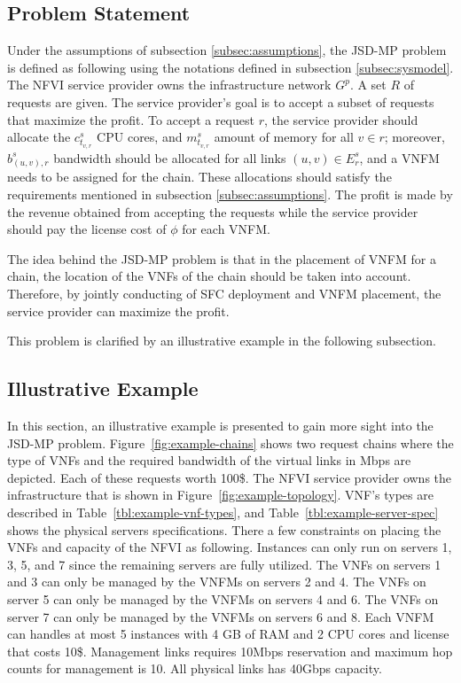 \subsection{Problem Statement}
Under the assumptions of subsection \ref{subsec:assumptions}, the JSD-MP problem is defined as following using the notations defined in subsection \ref{subsec:sysmodel}.
The NFVI service provider owns the infrastructure network \(G^p\). A set \(R\) of requests are given. The service provider's goal is to accept a subset of requests that maximize the profit.
To accept a request \(r\), the service provider should allocate the \(c^s_{t_{v,r}}\) CPU cores, and \(m^s_{t_{v,r}}\) amount of memory for all \(v \in r\);
moreover, \(b^s_{(u,v),r}\) bandwidth should be allocated for all links \((u,v) \in E^s_r\), and a VNFM needs to be assigned for the chain.
These allocations should satisfy the requirements mentioned in subsection \ref{subsec:assumptions}.
The profit is made by the revenue obtained from accepting the requests while the service provider should pay the license cost of \(\phi\) for each VNFM.

The idea behind the JSD-MP problem is that in the placement of VNFM for a chain, the location of the VNFs of the chain should be taken into account. Therefore, by jointly conducting of SFC deployment and VNFM placement, the service provider can maximize the profit.

This problem is clarified by an illustrative example in the following subsection.

\subsection{Illustrative Example}
In this section, an illustrative example is presented to gain more sight into the JSD-MP problem.
Figure~\ref{fig:example-chains} shows two request chains where the type of VNFs and the required bandwidth of the virtual links in Mbps are depicted. Each of these requests worth 100\$.
The NFVI service provider owns the infrastructure that is shown in Figure~\ref{fig:example-topology}.
VNF's types are described in Table~\ref{tbl:example-vnf-types}, and 
Table~\ref{tbl:example-server-spec} shows the physical servers specifications.
There a few constraints on placing the VNFs and capacity of the NFVI as following.
Instances can only run on servers 1, 3, 5, and 7 since the remaining servers are fully utilized.
The VNFs on servers 1 and 3 can only be managed by the VNFMs on servers 2 and 4.
The VNFs on server 5 can only be managed by the VNFMs on servers 4 and 6.
The VNFs on server 7 can only be managed by the VNFMs on servers 6 and 8.
Each VNFM can handles at most 5 instances with 4 GB of RAM and 2 CPU cores and license that costs 10\$.
Management links requires 10Mbps reservation and maximum hop counts for management is 10.
All physical links has 40Gbps capacity. 


